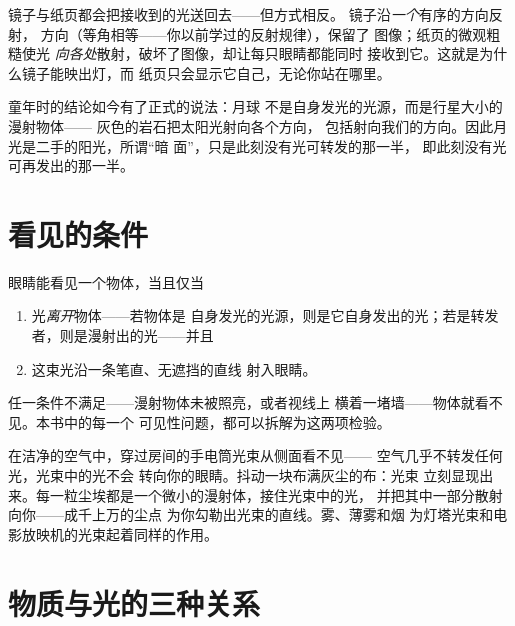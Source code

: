 \begin{example}[漫射不是镜面反射]\label{ex:g7:light-sources-propagation:notmirror}
镜子与纸页都会把接收到的光送回去——但方式相反。
镜子沿\emph{一个}有序的方向反射，
方向（等角相等——你以前学过的反射规律），保留了
图像；纸页的微观粗糙使光
\emph{向各处}散射，破坏了图像，却让每只眼睛都能同时
接收到它。这就是为什么镜子能映出灯，而
纸页只会显示它自己，无论你站在哪里。
\end{example}

\begin{example}[月球的案子已结]\label{ex:g7:light-sources-propagation:moon}
童年时的结论如今有了正式的说法：月球
不是自身发光的光源，而是行星大小的漫射物体——
灰色的岩石把太阳光射向各个方向，
包括射向我们的方向。因此月光是二手的阳光，所谓“暗
面”，只是此刻没有光可转发的那一半，
即此刻没有光可再发出的那一半。
\end{example}

\section{看见的条件}

\begin{proposition}[视觉的两个条件]\label{prop:g7:light-sources-propagation:vision}
眼睛能看见一个物体，当且仅当
\begin{enumerate}
  \item 光\emph{离开}物体——若物体是
        自身发光的光源，则是它自身发出的光；若是转发者，则是漫射出的光——并且
  \item 这束光沿一条笔直、无遮挡的直线
        射入眼睛。
\end{enumerate}
任一条件不满足——漫射物体未被照亮，或者视线上
横着一堵墙——物体就看不见。本书中的每一个
可见性问题，都可以拆解为这两项检验。
\end{proposition}

\begin{example}[被看见的光束]\label{ex:g7:light-sources-propagation:beam}
在洁净的空气中，穿过房间的手电筒光束从侧面看不见——
空气几乎不转发任何光，光束中的光不会
转向你的眼睛。抖动一块布满灰尘的布：光束
立刻显现出来。每一粒尘埃都是一个微小的漫射体，接住光束中的光，
并把其中一部分散射向你——成千上万的尘点
为你勾勒出光束的直线。雾、薄雾和烟
为灯塔光束和电影放映机的光束起着同样的作用。
\end{example}

\section{物质与光的三种关系}

